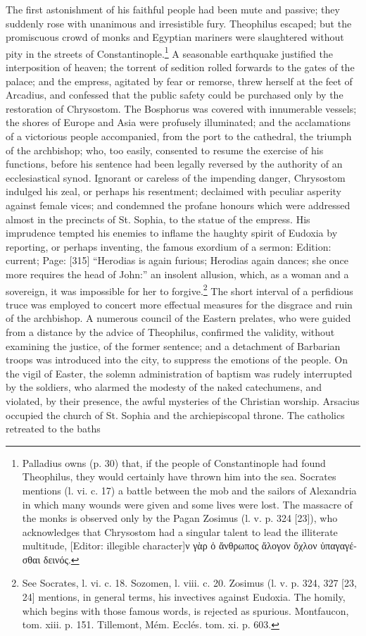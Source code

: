 The first astonishment of his faithful people had been mute and passive; they suddenly rose with unanimous and irresistible fury. Theophilus escaped; but the promiscuous crowd of monks and Egyptian mariners were slaughtered without pity in the streets of Constantinople.\footnote{Palladius owns (p. 30) that, if the people of Constantinople had found Theophilus, they would certainly have thrown him into the sea. Socrates mentions (l. vi. c. 17) a battle between the mob and the sailors of Alexandria in which many wounds were given and some lives were lost. The massacre of the monks is observed only by the Pagan Zosimus (l. v. p. 324 [23]), who acknowledges that Chrysostom had a singular talent to lead the illiterate multitude, [Editor: illegible character]\textgreek{ν γ\texthebrew{ὰ}ρ \texthebrew{ὀ ἄ}νθρωπος \texthebrew{ἄ}λογον \texthebrew{ὄ}χλον \texthebrew{ὑ}παγαγέσθαι δεινός}.} A seasonable earthquake justified the interposition of heaven; the torrent of sedition rolled forwards to the gates of the palace; and the empress, agitated by fear or remorse, threw herself at the feet of Arcadius, and confessed that the public safety could be purchased only by the restoration of Chrysostom. The Bosphorus was covered with innumerable vessels; the shores of Europe and Asia were profusely illuminated; and the acclamations of a victorious people accompanied, from the port to the cathedral, the triumph of the archbishop; who, too easily, consented to resume the exercise of his functions, before his sentence had been legally reversed by the authority of an ecclesiastical synod. Ignorant or careless of the impending danger, Chrysostom indulged his zeal, or perhaps his resentment; declaimed with peculiar asperity against female vices; and condemned the profane honours which were addressed almost in the precincts of St. Sophia, to the statue of the empress. His imprudence tempted his enemies to inflame the haughty spirit of Eudoxia by reporting, or perhaps inventing, the famous exordium of a sermon: Edition: current; Page: [315] \texthebrew{“}Herodias is again furious; Herodias again dances; she once more requires the head of John:\texthebrew{}” an insolent allusion, which, as a woman and a sovereign, it was impossible for her to forgive.\footnote{See Socrates, l. vi. c. 18. Sozomen, l. viii. c. 20. Zosimus (l. v. p. 324, 327 [23, 24] mentions, in general terms, his invectives against Eudoxia. The homily, which begins with those famous words, is rejected as spurious. Montfaucon, tom. xiii. p. 151. Tillemont, Mém. Ecclés. tom. xi. p. 603.} The short interval of a perfidious truce was employed to concert more effectual measures for the disgrace and ruin of the archbishop. A numerous council of the Eastern prelates, who were guided from a distance by the advice of Theophilus, confirmed the validity, without examining the justice, of the former sentence; and a detachment of Barbarian troops was introduced into the city, to suppress the emotions of the people. On the vigil of Easter, the solemn administration of baptism was rudely interrupted by the soldiers, who alarmed the modesty of the naked catechumens, and violated, by their presence, the awful mysteries of the Christian worship. Arsacius occupied the church of St. Sophia and the archiepiscopal throne. The catholics retreated to the baths 